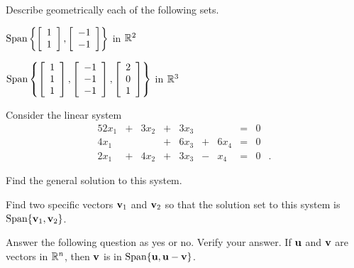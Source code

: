 \item Describe geometrically each of the following sets.
	\ba
	\item $\text{Span}\left\{\left[ \begin{array}{c} 1\\1 \end{array} \right], \left[ \begin{array}{r} -1\\-1 \end{array} \right]\right\}$ in $\mathbb{R}^2$
	\item $\text{Span}\left\{\left[ \begin{array}{c} 1\\1\\1 \end{array} \right], \left[ \begin{array}{r} -1\\-1\\-1 \end{array} \right], \left[ \begin{array}{c} 2\\0\\1 \end{array} \right]\right\}$ in $\mathbb{R}^3$
	\ea

\item Consider the linear system 
\begin{alignat*}{5}
{2}x_1	&{}+{}	&{3}x_2 &{}+{}	&{3}x_3	&{}		&{}		&{}={} &0&{}   \\
{4}x_1	&{}		&{} 		&{}+{}	&{6}x_3	&{}+{}	&{6}x_4	&{}={} &0&{} \\
{2}x_1	&{}+{}	&{4}x_2	&{}+{}	&{3}x_3	&{}-{}	&{}x_4	&{}={} &0&{.} 
\end{alignat*}
	\ba
	\item Find the general solution to this system.
	\item Find two specific vectors $\mathbf{v}_1$ and $\mathbf{v}_2$ so that the solution set to this system is $\text{Span}\{\mathbf{v}_1, \mathbf{v}_2\}$. 
	\ea
	
\item Answer the following question as yes or no. Verify your answer. If $\mathbf{u}$ and $\mathbf{v}$ are vectors in $\mathbb{R}^n$, then $\mathbf{v}$ is in $\text{Span}\{\mathbf{u}, \mathbf{u}-\mathbf{v}\}$. 



